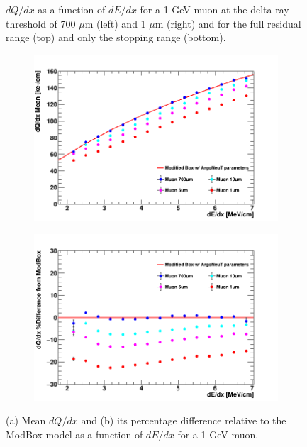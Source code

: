 \begin{figure}[hp!]
{        	$dQ/dx$ as a function of $dE/dx$ for a 1 GeV muon at the delta ray threshold of 700 $\mu$m (left) and 1 $\mu$m (right) and for the full residual range (top) and only the stopping range (bottom).
	}
        \label{fig:muon_2d}
        \begin{subfigure}[b]{0.495\textwidth}   
            \centering 
            \includegraphics[width=\textwidth]{mu_profile}
            \caption{}%
            \label{fig:mu_range_delta_magnitude}
        \end{subfigure}
        \hfill
        \begin{subfigure}[b]{0.495\textwidth}   
            \centering 
            \includegraphics[width=\textwidth]{mu_profile_diff}
            \caption{}%
            \label{fig:mu_range_delta_diff}
        \end{subfigure}
	\caption[Impacts of Delta Ray Fluctuations on Muons]{(a) Mean $dQ/dx$ and (b) its percentage difference relative to the ModBox model as a function of $dE/dx$ for a 1 GeV muon. }
        \label{fig:mu_range_delta}
\end{figure}

